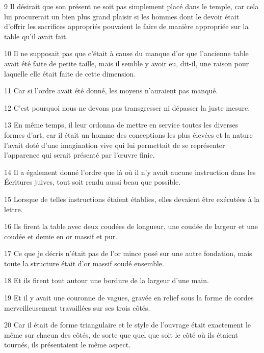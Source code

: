 \par 9 Il désirait que son présent ne soit pas simplement placé dans le temple, car cela lui procurerait un bien plus grand plaisir si les hommes dont le devoir était d'offrir les sacrifices appropriés pouvaient le faire de manière appropriée sur la table qu'il avait fait.

\par 10 Il ne supposait pas que c'était à cause du manque d'or que l'ancienne table avait été faite de petite taille, mais il semble y avoir eu, dit-il, une raison pour laquelle elle était faite de cette dimension.

\par 11 Car si l'ordre avait été donné, les moyens n'auraient pas manqué.

\par 12 C'est pourquoi nous ne devons pas transgresser ni dépasser la juste mesure.

\par 13 En même temps, il leur ordonna de mettre en service toutes les diverses formes d'art, car il était un homme des conceptions les plus élevées et la nature l'avait doté d'une imagination vive qui lui permettait de se représenter l'apparence qui serait présenté par l’œuvre finie.

\par 14 Il a également donné l'ordre que là où il n'y avait aucune instruction dans les Écritures juives, tout soit rendu aussi beau que possible.

\par 15 Lorsque de telles instructions étaient établies, elles devaient être exécutées à la lettre.

\par 16 Ils firent la table avec deux coudées de longueur, une coudée de largeur et une coudée et demie en or massif et pur.

\par 17 Ce que je décris n'était pas de l'or mince posé sur une autre fondation, mais toute la structure était d'or massif soudé ensemble.

\par 18 Et ils firent tout autour une bordure de la largeur d'une main.

\par 19 Et il y avait une couronne de vagues, gravée en relief sous la forme de cordes merveilleusement travaillées sur ses trois côtés.

\par 20 Car il était de forme triangulaire et le style de l'ouvrage était exactement le même sur chacun des côtés, de sorte que quel que soit le côté où ils étaient tournés, ils présentaient le même aspect.

